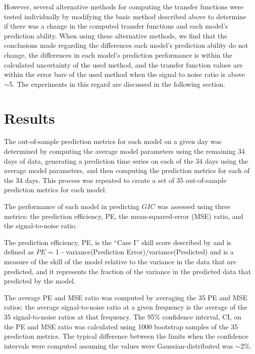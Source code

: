 \documentclass[draft,linenumbers]{agujournal2018}
\begin{document}
However, several alternative methods for computing the transfer functions were tested individually by modifying the basic method described above to determine if there was a change in the computed transfer functions and each model's prediction ability. When using these alternative methods, we find that the conclusions made regarding the differences each model's prediction ability do not change, the differences in each model's prediction performance is within the calculated uncertainty of the used method, and the transfer function values are within the error bars of the used method when the signal to noise ratio is above $\sim$5. The experiments in this regard are discussed in the following section.

\section{Results}

The out-of-sample prediction metrics for each model on a given day was determined by computing the average model parameters using the remaining 34 days of data, generating a prediction time series on each of the 34 days using the average model parameters, and then computing the prediction metrics for each of the 34 days. This process was repeated to create a set of 35 out-of-sample prediction metrics for each model.

The performance of each model in predicting $GIC$ was assessed using three metrics: the prediction efficiency, PE, the mean-squared-error (MSE) ratio, and the signal-to-noise ratio. 

The prediction efficiency, PE, is the ``Case I'' skill score described by \cite{Murphy1988} and is defined as $PE$ = 1 - variance(Prediction Error)/variance(Predicted) and is a measure of the skill of the model relative to the variance in the data that are predicted, and it represents the fraction of the variance in the predicted data that predicted by the model.

The average PE and MSE ratio was computed by averaging the 35 PE and MSE ratios; the average signal-to-noise ratio at a given frequency is the average of the 35 signal-to-noise ratios at that frequency. The 95\% confidence interval, CI, on the PE and MSE ratio was calculated using 1000 bootstrap samples of the 35 prediction metrics. The typical difference between the limits when the confidence intervals were computed assuming the values were Gaussian-distributed was $\sim$2\%.
\end{document}
